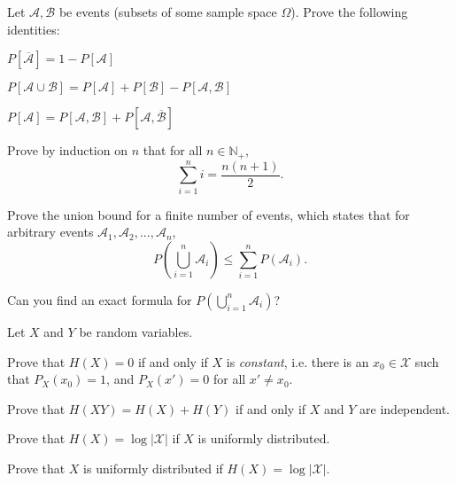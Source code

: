 \documentclass[a4paper,10pt,landscape,twocolumn]{scrartcl}
\begin{document}
\begin{exercise}[Events]
Let $\mathcal{A}, \mathcal{B}$ be events (subsets of some sample space $\Omega$). Prove the following identities:
	\begin{subex}
	$P[\overline{\mathcal{A}}] = 1 - P[\mathcal{A}]$
	\end{subex}
	
	\begin{subex}
	$P[\mathcal{A} \cup \mathcal{B}] = P[\mathcal{A}] + P[\mathcal{B}] - P[\mathcal{A},\mathcal{B}]$
	\end{subex}
	
	\begin{subex}
	$P[\mathcal{A}] = P[\mathcal{A},\mathcal{B}] + P[\mathcal{A},\overline{\mathcal{B}}]$
	\end{subex}
\end{exercise}

\begin{exercise}

	\begin{subex}
	Prove by induction on $n$ that for all $n \in \mathbb{N}_+$,
	\[
	\sum_{i=1}^n i = \frac{n(n+1)}{2}.
	\]
	\end{subex}
	
	\begin{subex}
	Prove the union bound for a finite number of events, which states that for arbitrary events $\mathcal{A}_1, \mathcal{A}_2, ..., \mathcal{A}_n$,
	\[
	P \left( \bigcup_{i=1}^n \mathcal{A}_i \right) \leq \sum_{i=1}^n P(\mathcal{A}_i).
	\]
	\end{subex}

	\begin{subex**}
	Can you find an exact formula for $P\left( \bigcup_{i=1}^n \mathcal{A}_i \right)$?
	\end{subex**}

\end{exercise}


\enlargethispage{1cm}

\begin{exercise}
Let $X$ and $Y$ be random variables.
	\begin{subex}
	Prove that $H(X) = 0$ if and only if $X$ is \emph{constant}, i.e. there is an $x_0 \in \mathcal{X}$ such that $P_X(x_0) = 1$, and $P_X(x') = 0$ for all $x' \neq x_0$.
	\end{subex}
	
	\begin{subex}
	Prove that $H(XY) = H(X) + H(Y)$ if and only if $X$ and $Y$ are independent.
	\end{subex}

	\begin{subex}
	Prove that $H(X) = \log |\mathcal{X}|$ if $X$ is uniformly distributed.
	\end{subex}

	\begin{subex**}
	Prove that $X$ is uniformly distributed if $H(X) = \log |\mathcal{X}|$.
	\end{subex**}
	
\end{exercise}
\end{document}
